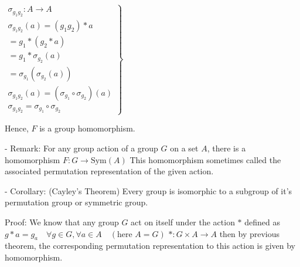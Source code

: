 $\left. \begin{matrix} \sigma_{g_1 g_2} : A \to A \\ \sigma_{g_1 g_2}(a) = (g_1 g_2) * a \\ = g_1 * (g_2 * a) \\ = g_1 * \sigma_{g_2}(a) \\ = \sigma_{g_1}(\sigma_{g_2}(a)) \\ \sigma_{g_1 g_2}(a) = (\sigma_{g_1} \circ \sigma_{g_2})(a) \\ \sigma_{g_1 g_2} = \sigma_{g_1} \circ \sigma_{g_2} \end{matrix} \right\}$

Hence, $F$ is a group homomorphism.

- Remark: For any group action of a group $G$ on a set $A$, there is a homomorphism
$F: G \to \text{Sym}(A)$
This homomorphism sometimes called the associated permutation representation of the given action.

- Corollary: (Cayley's Theorem) Every group is isomorphic to a subgroup of it's permutation group or symmetric group.

Proof: We know that any group $G$ act on itself under the action $*$ defined as $g * a = g_a \quad \forall g \in G, \forall a \in A \quad (\text{here } A = G)$
$*: G \times A \to A$
then by previous theorem, the corresponding permutation representation to this action is given by homomorphism.
